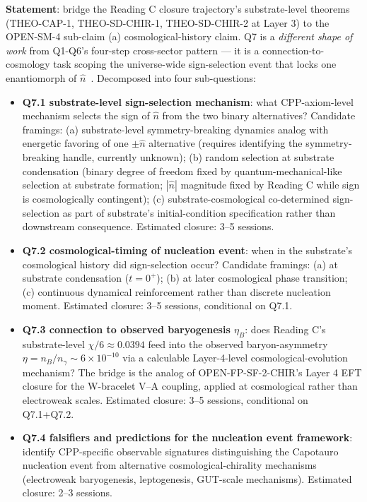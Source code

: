 \documentclass[11pt,letterpaper]{article}
\begin{document}
\textbf{Statement}: bridge the Reading C closure trajectory's substrate-level theorems (THEO-CAP-1, THEO-SD-CHIR-1, THEO-SD-CHIR-2 at Layer 3) to the OPEN-SM-4 sub-claim (a) cosmological-history claim. Q7 is a \emph{different shape of work} from Q1-Q6's four-step cross-sector pattern --- it is a connection-to-cosmology task scoping the universe-wide sign-selection event that locks one enantiomorph of $\hat{n}$~\cite{abshier_capotauro_chiral_mechanism_sketch}. Decomposed into four sub-questions:

\begin{itemize}\setlength\itemsep{0.3em}
    \item \textbf{Q7.1 substrate-level sign-selection mechanism}: what CPP-axiom-level mechanism selects the sign of $\hat{n}$ from the two binary alternatives? Candidate framings: (a) substrate-level symmetry-breaking dynamics analog with energetic favoring of one $\pm\hat{n}$ alternative (requires identifying the symmetry-breaking handle, currently unknown); (b) random selection at substrate condensation (binary degree of freedom fixed by quantum-mechanical-like selection at substrate formation; $|\hat{n}|$ magnitude fixed by Reading C while sign is cosmologically contingent); (c) substrate-cosmological co-determined sign-selection as part of substrate's initial-condition specification rather than downstream consequence. Estimated closure: 3--5 sessions.
    \item \textbf{Q7.2 cosmological-timing of nucleation event}: when in the substrate's cosmological history did sign-selection occur? Candidate framings: (a) at substrate condensation ($t = 0^+$); (b) at later cosmological phase transition; (c) continuous dynamical reinforcement rather than discrete nucleation moment. Estimated closure: 3--5 sessions, conditional on Q7.1.
    \item \textbf{Q7.3 connection to observed baryogenesis $\eta_B$}: does Reading C's substrate-level $\chi/6 \approx 0.0394$ feed into the observed baryon-asymmetry $\eta = n_B/n_\gamma \sim 6 \times 10^{-10}$ via a calculable Layer-4-level cosmological-evolution mechanism? The bridge is the analog of OPEN-FP-SF-2-CHIR's Layer 4 EFT closure for the W-bracelet V--A coupling, applied at cosmological rather than electroweak scales. Estimated closure: 3--5 sessions, conditional on Q7.1+Q7.2.
    \item \textbf{Q7.4 falsifiers and predictions for the nucleation event framework}: identify CPP-specific observable signatures distinguishing the Capotauro nucleation event from alternative cosmological-chirality mechanisms (electroweak baryogenesis, leptogenesis, GUT-scale mechanisms). Estimated closure: 2--3 sessions.
\end{itemize}
\end{document}
